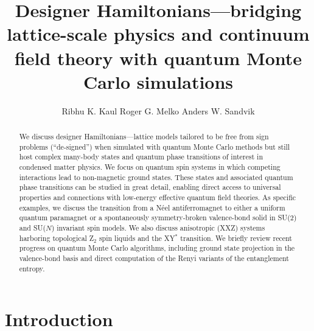 \documentclass[range]{ar2e}
\begin{document}




\title{Designer Hamiltonians---bridging lattice-scale physics and continuum field theory with 
quantum Monte Carlo simulations} 

\author{Ribhu K. Kaul
Roger G. Melko
Anders W. Sandvik
}

\begin{abstract}
We discuss designer Hamiltonians---lattice models tailored to be free from sign problems (``de-signed'') when simulated with quantum 
Monte Carlo methods but still host complex  many-body states and quantum phase transitions of interest in condensed matter 
physics. We focus on quantum spin systems in which competing interactions lead to non-magnetic ground states. These states and 
associated quantum phase transitions can be studied in great detail, enabling direct access to universal properties and connections 
with low-energy effective quantum field theories. As specific examples, we discuss the transition from a N\'eel antiferromagnet to 
either a uniform quantum paramagnet or a spontaneously symmetry-broken valence-bond solid in SU($2$) and SU($N$) invariant spin models. 
We also discuss anisotropic (XXZ) systems harboring topological Z$_2$ spin liquids and the XY$^*$ transition. We briefly review recent 
progress on quantum Monte Carlo algorithms, including ground state projection in the valence-bond basis and direct computation 
of the Renyi variants of the entanglement entropy.
\end{abstract}

\maketitle

\section{Introduction}
\label{sec:intro}
\end{document}
